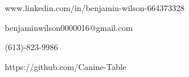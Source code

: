 \begin{NexMainBox}[light, hdrA, sdwA, crnA, title=Contact Information]
	\begin{NexMainBox}
		\faLinkedin\hspace{12pt}www.linkedin.com/in/benjamin-wilson-664373328\par\smallskip%
		\faMailBulk\hspace{9pt}benjaminwilson0000016@gmail.com\par\smallskip%
		\faPhone*\hspace{10pt}(613)-823-9986\par\smallskip%
		\faGithub\hspace{10pt}https://github.com/Canine-Table\smallskip%
	\end{NexMainBox}
\end{NexMainBox}
\smallskip

